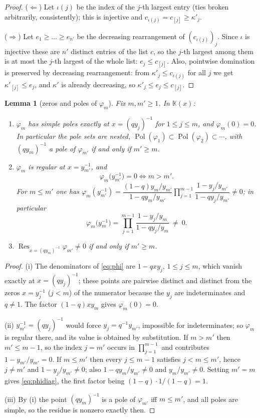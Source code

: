 \documentclass[11pt]{article}
\newtheorem{lem}[thm]{Lemma}
\theoremstyle{definition}
\theoremstyle{remark}
\DeclareMathOperator{\Res}{Res}
\newcommand{\KK}{\mathbb{K}}
\begin{document}
\begin{proof}
($\Leftarrow$) Let $\iota(j)$ be the index of the $j$-th largest entry (ties broken
arbitrarily, consistently); this is injective and $c_{\iota(j)}=c_{[j]}\ge\kappa'_j$.

($\Rightarrow$) Let $e_1\ge\dots\ge e_{n'}$ be the decreasing rearrangement of
$(c_{\iota(j)})_{j}$. Since $\iota$ is injective these are $n'$ distinct entries of the list
$c$, so the $j$-th largest among them is at most the $j$-th largest of the whole list:
$e_j\le c_{[j]}$. Also, pointwise domination is preserved by decreasing rearrangement: from
$\kappa'_j\le c_{\iota(j)}$ for all $j$ we get $\kappa'_{[j]}\le e_j$, and $\kappa'$ is already
decreasing, so $\kappa'_j\le e_j\le c_{[j]}$.
\end{proof}

\begin{lem}[zeros and poles of $\varphi_m$]\label{lem:phi}
Fix $m,m'\ge1$. In $\KK(x)$:
\begin{enumerate}
\item[(i)] $\varphi_m$ has simple poles exactly at $x=(qy_j)^{-1}$ for $1\le j\le m$, and
  $\varphi_m(0)=0$. In particular the pole sets are nested,
  $\operatorname{Pol}(\varphi_1)\subset\operatorname{Pol}(\varphi_2)\subset\cdots$, with
  $(qy_m)^{-1}$ a pole of $\varphi_{m'}$ if and only if $m'\ge m$.
\item[(ii)] $\varphi_m$ is regular at $x=y_{m'}^{-1}$, and
  \[
    \varphi_m\bigl(y_{m'}^{-1}\bigr)=0 \iff m>m'.
  \]
  For $m\le m'$ one has
  $\varphi_m(y_{m'}^{-1})=\dfrac{(1-q)y_m/y_{m'}}{1-qy_m/y_{m'}}
   \prod_{j=1}^{m-1}\dfrac{1-y_j/y_{m'}}{1-qy_j/y_{m'}}\ne 0$; in particular
  \begin{equation}\label{eq:phidiag}
    \varphi_m\bigl(y_m^{-1}\bigr)=\prod_{j=1}^{m-1}\frac{1-y_j/y_m}{1-qy_j/y_m}\ \ne\ 0 .
  \end{equation}
\item[(iii)] $\Res_{x=(qy_m)^{-1}}\varphi_{m'}\ne0$ if and only if $m'\ge m$.
\end{enumerate}
\end{lem}

\begin{proof}
(i) The denominators of \eqref{eq:phi} are $1-qxy_j$, $1\le j\le m$, which vanish exactly at
$x=(qy_j)^{-1}$; these points are pairwise distinct and distinct from the zeros $x=y_j^{-1}$
($j<m$) of the numerator because the $y_j$ are indeterminates and $q\neq1$. The factor
$(1-q)xy_m$ gives $\varphi_m(0)=0$.

(ii) $y_{m'}^{-1}=(qy_j)^{-1}$ would force $y_j=q^{-1}y_{m'}$, impossible for indeterminates;
so $\varphi_m$ is regular there, and its value is obtained by substitution. If $m>m'$ then
$m'\le m-1$, so the index $j=m'$ occurs in $\prod_{j=1}^{m-1}$ and contributes
$1-y_{m'}/y_{m'}=0$. If $m\le m'$ then every $j\le m-1$ satisfies $j<m\le m'$, hence $j\ne m'$
and $1-y_j/y_{m'}\ne0$; also $1-qy_m/y_{m'}\ne0$ and $y_m/y_{m'}\ne0$. Setting $m'=m$ gives
\eqref{eq:phidiag}, the first factor being $(1-q)\cdot1/(1-q)=1$.

(iii) By (i) the point $(qy_m)^{-1}$ is a pole of $\varphi_{m'}$ iff $m\le m'$, and all poles
are simple, so the residue is nonzero exactly then.
\end{proof}
\end{document}
